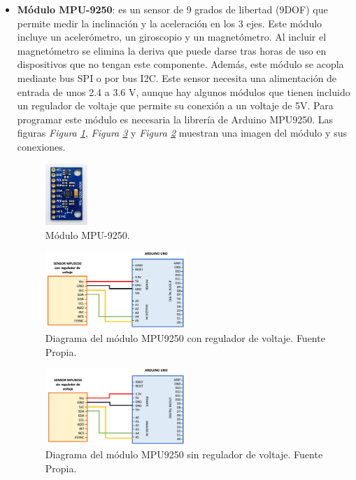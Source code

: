 \begin{itemize}
    \item \textbf{Módulo MPU-9250}\cite{MPU9250_1,MPU9250_2}: es un sensor de 9 grados de libertad (9DOF) que permite medir la inclinación y la aceleración en los 3 ejes. Este módulo incluye un acelerómetro, un giroscopio y un magnetómetro. Al incluir el magnetómetro se elimina la deriva que puede darse tras horas de uso en dispositivos que no tengan este componente. Además, este módulo se acopla mediante bus SPI o por bus I2C. Este sensor necesita una alimentación de entrada de unos 2.4 a 3.6 V, aunque hay algunos módulos que tienen incluido un regulador de voltaje que permite su conexión a un voltaje de 5V. Para programar este módulo es necesaria la librería de Arduino MPU9250\cite{libMPU9250}. Las figuras \textit{Figura \ref{fig:imgMPU9250}}, \textit{Figura \ref{fig:MPU9250}} y \textit{Figura \ref{fig:MPU9250R}} muestran una imagen del módulo y sus conexiones.
\begin{figure}[h!]
    \centering
    \includegraphics[width=0.15\textwidth]{img/imgMPU9250.jpg}
    \caption{Módulo MPU-9250\cite{imgMPU9250}.}
    \label{fig:imgMPU9250} 
\end{figure}

\begin{figure}[h!]
    \centering
    \includegraphics[width=0.5\textwidth]{img/MPU9250Regulador.png}
    \caption{Diagrama del módulo MPU9250 con regulador de voltaje. Fuente Propia.}
    \label{fig:MPU9250R} 
\end{figure}
\begin{figure}[h!]
    \centering
    \includegraphics[width=0.5\textwidth]{img/MPU9250SinRegulador.png}
    \caption{Diagrama del módulo MPU9250 sin regulador de voltaje. Fuente Propia.}
    \label{fig:MPU9250} 
\end{figure}

\end{itemize}


